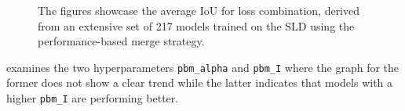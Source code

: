 \begin{figure}[H]%
  \centering
  \caption[Average IoU for Loss Combination (Skin Lesion)]{The figures showcase the average \ac{IoU} for loss combination, derived from an extensive set of 217 models trained on the \ac{SLD} using the performance-based merge strategy.}
  \label{continous_loss_combination_results_melanoma_short}
\end{figure}
 examines the two hyperparameters \texttt{pbm\_alpha} and \texttt{pbm\_I} where the graph for the former does not show a clear trend while the latter indicates that models with a higher \texttt{pbm\_I} are performing better.
